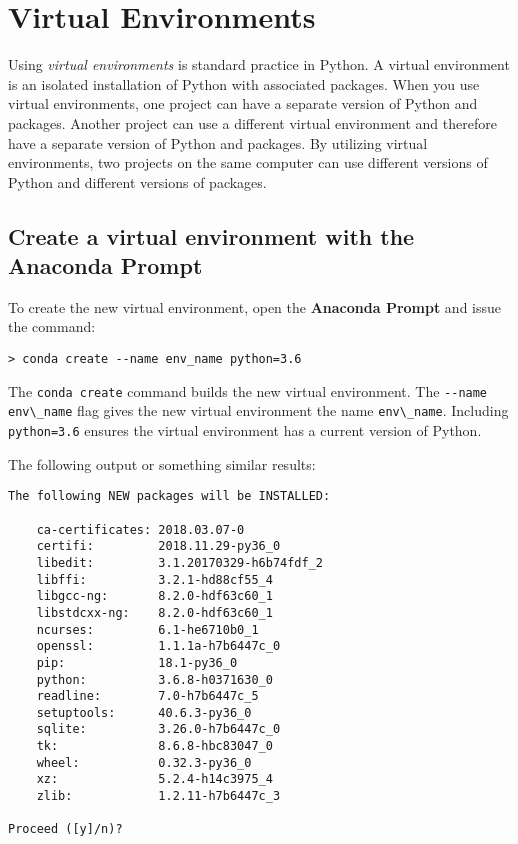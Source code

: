 \documentclass{book}
\newcommand{\passthrough}[1]{#1}
\begin{document}
    
        \hypertarget{virtual-environments}{%
\section{Virtual Environments}\label{virtual-environments}}
    




    
        Using \emph{virtual environments} is standard practice in Python. A
virtual environment is an isolated installation of Python with
associated packages. When you use virtual environments, one project can
have a separate version of Python and packages. Another project can use
a different virtual environment and therefore have a separate version of
Python and packages. By utilizing virtual environments, two projects on
the same computer can use different versions of Python and different
versions of packages.
    




    
        \hypertarget{create-a-virtual-environment-with-the-anaconda-prompt}{%
\subsection{Create a virtual environment with the Anaconda
Prompt}\label{create-a-virtual-environment-with-the-anaconda-prompt}}

To create the new virtual environment, open the \textbf{Anaconda Prompt}
and issue the command:

\begin{lstlisting}
> conda create --name env_name python=3.6
\end{lstlisting}

The \passthrough{\lstinline!conda create!} command builds the new
virtual environment. The \passthrough{\lstinline!--name env\_name!} flag
gives the new virtual environment the name
\passthrough{\lstinline!env\_name!}. Including
\passthrough{\lstinline!python=3.6!} ensures the virtual environment has
a current version of Python.

The following output or something similar results:

\begin{lstlisting}
The following NEW packages will be INSTALLED:

    ca-certificates: 2018.03.07-0           
    certifi:         2018.11.29-py36_0      
    libedit:         3.1.20170329-h6b74fdf_2
    libffi:          3.2.1-hd88cf55_4       
    libgcc-ng:       8.2.0-hdf63c60_1       
    libstdcxx-ng:    8.2.0-hdf63c60_1       
    ncurses:         6.1-he6710b0_1         
    openssl:         1.1.1a-h7b6447c_0      
    pip:             18.1-py36_0            
    python:          3.6.8-h0371630_0       
    readline:        7.0-h7b6447c_5         
    setuptools:      40.6.3-py36_0          
    sqlite:          3.26.0-h7b6447c_0      
    tk:              8.6.8-hbc83047_0       
    wheel:           0.32.3-py36_0          
    xz:              5.2.4-h14c3975_4       
    zlib:            1.2.11-h7b6447c_3      

Proceed ([y]/n)?
\end{lstlisting}
\end{document}
